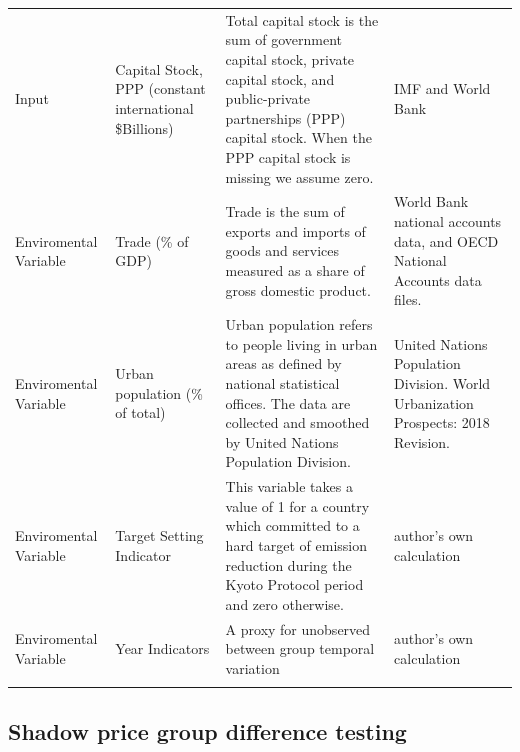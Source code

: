 \documentclass[12pt,]{article}
\begin{document}
\begin{ThreePartTable}
\begin{longtable}[t]{>{\raggedright\arraybackslash}p{10em}>{\raggedright\arraybackslash}p{10em}>{\raggedright\arraybackslash}p{10em}>{\raggedright\arraybackslash}p{10em}}
Input & Capital Stock, PPP (constant international \$Billions) & Total capital stock is the sum of government capital stock, private capital stock, and public-private partnerships (PPP) capital stock.  When the PPP capital stock is missing we assume zero. & IMF and World Bank\\
Enviromental Variable & Trade (\% of GDP) & Trade is the sum of exports and imports of goods and services measured as a share of gross domestic product. & World Bank national accounts data, and OECD National Accounts data files.\\
\addlinespace
Enviromental Variable & Urban population (\% of total) & Urban population refers to people living in urban areas as defined by national statistical offices. The data are collected and smoothed by United Nations Population Division. & United Nations Population Division. World Urbanization Prospects: 2018 Revision.\\
Enviromental Variable & Target Setting Indicator & This variable takes a value of 1 for a country which committed to a hard target of emission reduction during the Kyoto Protocol period and zero otherwise. & author's own calculation\\
Enviromental Variable & Year Indicators & A proxy for unobserved between group temporal variation & author's own calculation\\*
\end{longtable}
\end{ThreePartTable}
\endgroup{}

\hypertarget{shadow-price-group-difference-testing}{%
\subsection{Shadow price group difference testing}\label{shadow-price-group-difference-testing}}
\end{document}
